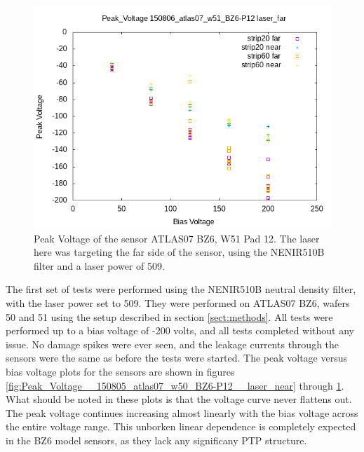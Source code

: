 \documentclass{report}
\begin{document}
            \begin{figure}[h] 
                \includegraphics[height=.4\textheight]{Peak_Voltage__150806_atlas07_w51_BZ6-P12__laser_far}
                \centering
                \caption{ Peak Voltage of the sensor ATLAS07 BZ6, W51 Pad 12. The laser here was targeting the far side of the sensor, using the NENIR510B filter and a laser power of 509. }
                \label{fig:Peak_Voltage__150806_atlas07_w51_BZ6-P12__laser_far}
            \end{figure}

            The first set of tests were performed using the NENIR510B neutral density filter, with the laser power set to 509. They were performed on ATLAS07 BZ6, wafers 50 and 51 using the setup described in section \ref{sect:methods}. All tests were performed up to a bias voltage of -200 volts, and all tests completed without any issue. No damage spikes were ever seen, and the leakage currents through the sensors were the same as before the tests were started. The peak voltage versus bias voltage plots for the sensors are shown in figures \ref{fig:Peak_Voltage__150805_atlas07_w50_BZ6-P12__laser_near} through \ref{fig:Peak_Voltage__150806_atlas07_w51_BZ6-P12__laser_far}. What should be noted in these plots is that the voltage curve never flattens out. The peak voltage continues increasing almost linearly with the bias voltage across the entire voltage range. This unborken linear dependence is completely expected in the BZ6 model sensors, as they lack any significany PTP structure.
\end{document}
